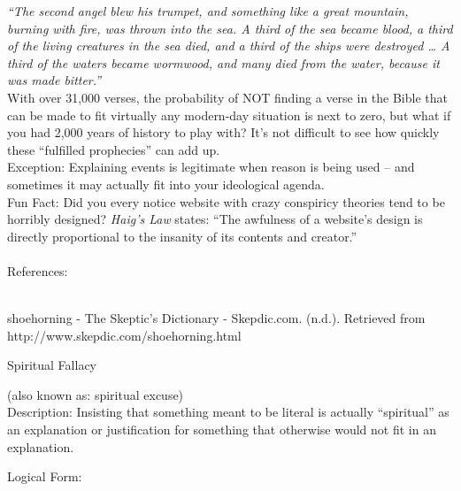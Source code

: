 \documentclass[a4paper,12pt,single,pdftex]{scrbook}
\begin{document}
    
      {\em “The second angel blew his trumpet, and something like a great mountain, burning with fire, was thrown into the sea. A third of the sea became blood, a third of the living creatures in the sea died, and a third of the ships were destroyed … A third of the waters became wormwood, and many died from the water, because it was made bitter.” }
    \\

    
      With over 31,000 verses, the probability of NOT finding a verse in the Bible that can be made to fit virtually any modern-day situation is next to zero, but what if you had 2,000 years of history to play with?  It’s not difficult to see how quickly these “fulfilled prophecies” can add up.
    \\

    
      Exception: Explaining events is legitimate when reason is being used -- and sometimes it may actually fit into your ideological agenda.
    \\

    
      Fun Fact: Did you every notice website with crazy conspiricy theories tend to be horribly designed? {\em Haig’s Law} states: “The awfulness of a website's design is directly proportional to the insanity of its contents and creator.”
    \\

    
      
    \\

    References:

    
      
        
      \\

      
        
          shoehorning - The Skeptic’s Dictionary - Skepdic.com. (n.d.). Retrieved from http://www.skepdic.com/shoehorning.html
        
      
    
  

Spiritual Fallacy
    
      (also known as: spiritual excuse)
    \\

  
    Description: Insisting that something meant to be literal is actually “spiritual” as an explanation or justification for something that otherwise would not fit in an explanation.

    
      Logical Form:
    \\
\end{document}
